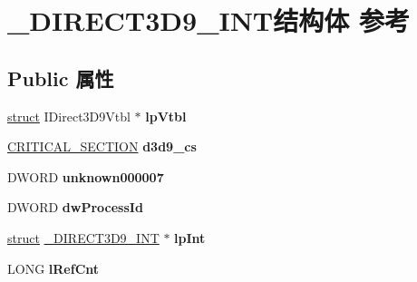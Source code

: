 \hypertarget{struct___d_i_r_e_c_t3_d9___i_n_t}{}\section{\+\_\+\+D\+I\+R\+E\+C\+T3\+D9\+\_\+\+I\+N\+T结构体 参考}
\label{struct___d_i_r_e_c_t3_d9___i_n_t}
\subsection*{Public 属性}
\begin{DoxyCompactItemize}
\item 
\mbox{\label{struct___d_i_r_e_c_t3_d9___i_n_t_ac21fe27c5e91ccd919ee75f13b4cc09f}} 
\hyperlink{interfacestruct}{struct} I\+Direct3\+D9\+Vtbl $\ast$ {\bfseries lp\+Vtbl}
\item 
\mbox{\label{struct___d_i_r_e_c_t3_d9___i_n_t_a4bac83d88b0d50012ae4bf4d7859129f}} 
\hyperlink{struct___c_r_i_t_i_c_a_l___s_e_c_t_i_o_n}{C\+R\+I\+T\+I\+C\+A\+L\+\_\+\+S\+E\+C\+T\+I\+ON} {\bfseries d3d9\+\_\+cs}
\item 
\mbox{\label{struct___d_i_r_e_c_t3_d9___i_n_t_a849fe3c30b3488997c7dc02c8246489c}} 
D\+W\+O\+RD {\bfseries unknown000007}
\item 
\mbox{\label{struct___d_i_r_e_c_t3_d9___i_n_t_ae114e38dd5d05349e4b608d70eb3d691}} 
D\+W\+O\+RD {\bfseries dw\+Process\+Id}
\item 
\mbox{\label{struct___d_i_r_e_c_t3_d9___i_n_t_a5f345d992bc2bd193e035fbe70b286b4}} 
\hyperlink{interfacestruct}{struct} \hyperlink{struct___d_i_r_e_c_t3_d9___i_n_t}{\+\_\+\+D\+I\+R\+E\+C\+T3\+D9\+\_\+\+I\+NT} $\ast$ {\bfseries lp\+Int}
\item 
\mbox{\label{struct___d_i_r_e_c_t3_d9___i_n_t_a6e1a754486ccc8db44dd4bcb968bd00f}} 
L\+O\+NG {\bfseries l\+Ref\+Cnt}
\item 
\mbox{\label{struct___d_i_r_e_c_t3_d9___i_n_t_a1bdb2e8189f5a4775df38b64f0dba798}} 

\end{DoxyCompactItemize}

